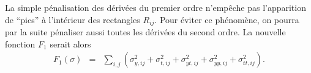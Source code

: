 \begin{Rem}
La simple p\'enalisation des d\'eriv\'ees du premier ordre 
n'emp\^eche pas l'apparition de ``pics'' \`a l'int\'erieur des 
rectangles $R_{ij}$. Pour \'eviter ce ph\'enom\`ene, on pourra par 
la suite p\'enaliser aussi toutes les d\'eriv\'ees du second ordre. 
La nouvelle fonction $F_1$ serait alors 
\begin{eqnarray*}
F_1(\sigma) &=& \sum\limits_{i,j}(\sigma_{y,ij}^2 + \sigma_{t,ij}^2 
+ \sigma_{yt,ij}^2 + \sigma_{yy,ij}^2 + \sigma_{tt,ij}^2). 
\end{eqnarray*}
\end{Rem}
